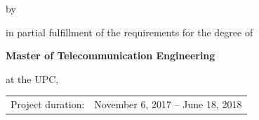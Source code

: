 \begin{titlepage}
\begin{center}
by

\bigskip
\bigskip

{\makeatletter
\titlefont\Large\@author
\makeatother}

\bigskip
\bigskip

in partial fulfillment of the requirements for the degree of

\bigskip
\bigskip

{\bfseries Master of Telecommunication Engineering}

\bigskip
\bigskip

at the UPC,


\vfill

\begin{tabular}{lll}
    Project duration: & \multicolumn{2}{l}{November 6, 2017 -- June 18, 2018} \\
       

\end{tabular}
\end{center}
\end{titlepage}
